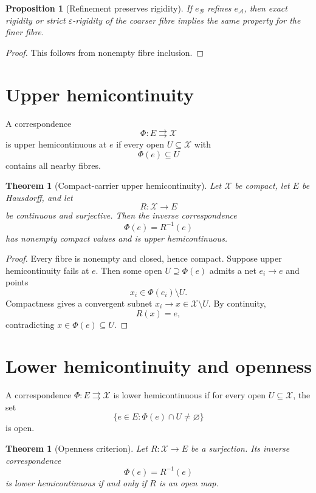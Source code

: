 \documentclass[11pt]{article}
\newtheorem{proposition}[definition]{Proposition}
\newtheorem{theorem}[definition]{Theorem}
\newcommand{\X}{\mathcal X}
\newcommand{\Acal}{\mathcal A}
\newcommand{\Bcal}{\mathcal B}
\begin{document}
\begin{proposition}[Refinement preserves rigidity]
If \(e_{\Bcal}\) refines \(e_{\Acal}\), then exact rigidity or strict
\(\varepsilon\)-rigidity of the coarser fibre implies the same property for
the finer fibre.
\end{proposition}

\begin{proof}
This follows from nonempty fibre inclusion.
\end{proof}

\section{Upper hemicontinuity}

A correspondence
\[
\Phi:E\rightrightarrows\X
\]
is upper hemicontinuous at \(e\) if every open \(U\subseteq\X\) with
\[
\Phi(e)\subseteq U
\]
contains all nearby fibres.

\begin{theorem}[Compact-carrier upper hemicontinuity]
\label{thm:uhc}
Let \(\X\) be compact, let \(E\) be Hausdorff, and let
\[
R:\X\to E
\]
be continuous and surjective. Then the inverse correspondence
\[
\Phi(e)=R^{-1}(e)
\]
has nonempty compact values and is upper hemicontinuous.
\end{theorem}

\begin{proof}
Every fibre is nonempty and closed, hence compact. Suppose upper
hemicontinuity fails at \(e\). Then some open \(U\supseteq\Phi(e)\) admits a
net \(e_i\to e\) and points
\[
x_i\in\Phi(e_i)\setminus U.
\]
Compactness gives a convergent subnet \(x_i\to x\in\X\setminus U\). By
continuity,
\[
R(x)=e,
\]
contradicting \(x\in\Phi(e)\subseteq U\).
\end{proof}

\section{Lower hemicontinuity and openness}

A correspondence \(\Phi:E\rightrightarrows\X\) is lower hemicontinuous if for
every open \(U\subseteq\X\), the set
\[
\{e\in E:\Phi(e)\cap U\neq\varnothing\}
\]
is open.

\begin{theorem}[Openness criterion]
Let \(R:\X\to E\) be a surjection. Its inverse correspondence
\[
\Phi(e)=R^{-1}(e)
\]
is lower hemicontinuous if and only if \(R\) is an open map.
\end{theorem}
\end{document}
